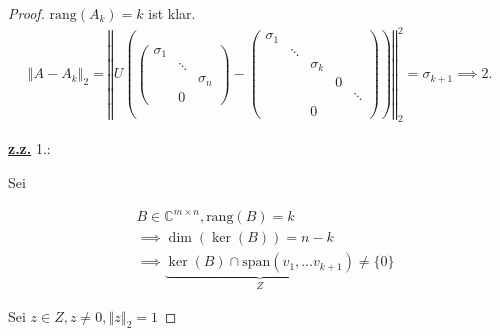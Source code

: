 \documentclass{book}
\def\C{\mathbb{C}}
\def\rang{\text{rang}}
\begin{document}
            \begin{proof}
                $\rang(A_k)=k$ ist klar.
                \begin{align*}
                    \left\Vert A-A_k \right\Vert_2=\left\Vert U\left(\begin{pmatrix}
                        \sigma_1 & &\\
                        &\ddots & \\
                        &&\sigma_n\\
                        &0&
                    \end{pmatrix}-\begin{pmatrix}
                        \sigma_1 & &&&\\
                        &\ddots & &&\\
                        &&\sigma_k&&\\
                        &&&0&\\
                        &&&&\ddots \\
                        &&0&&
                    \end{pmatrix}\right) \right\Vert_2^2=\sigma_{k+1}\implies 2.
                \end{align*}

                \underline{\textbf{z.z.}} 1.:

                Sei 

            \begin{align*}
                &B \in\C^{m\times n},\rang(B)=k\\
                &\implies \dim(\ker(B))=n-k\\
                &\implies \underbrace{\ker(B)\cap \text{span}(v_1,\dots v_{k+1})}_{Z}\neq \{0\}
            \end{align*}

            Sei $z\in Z,z\neq 0,\left\Vert z \right\Vert_2=1$


\end{proof}
\end{document}
